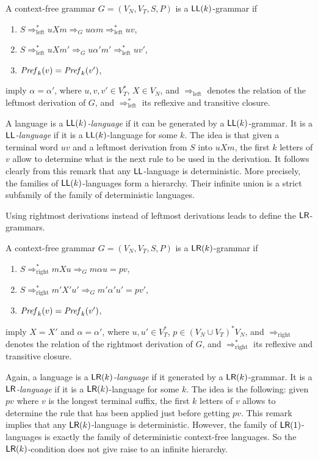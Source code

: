 A context-free grammar $G = (V_N, V_T, S, P)$ is a $\LL(k)$-grammar if

\begin{enumerate}[]
\item $S \Rightarrow^*_{\text{left}} u X m \Rightarrow_G u \alpha m \Rightarrow^*_{\text{left}} uv$,
\item $S \Rightarrow^*_{\text{left}} u X m' \Rightarrow_G u \alpha' m' \Rightarrow^*_{\text{left}} uv'$,
\item $\mbox{\it Pref\/}_k(v) = \mbox{\it Pref\/}_k(v')$,
\end{enumerate}

\noindent imply $\alpha = \alpha'$, where $u, v, v' \in V_T^*$, $X \in V_N$, and $\Rightarrow_{\text{left}}$ denotes the relation of the leftmost derivation of $G$, and $\Rightarrow^*_{\text{left}}$ its reflexive and transitive closure.

A language is a \emph{$\LL(k)$-language} if it can be generated by a $\LL(k)$-grammar. It is a \emph{$\LL$-language} if it is a $\LL(k)$-language for some $k$. The idea is that given a terminal word $uv$ and a leftmost derivation from $S$ into $uXm$, the first $k$ letters of $v$ allow to determine what is the next rule to be used in the derivation. It follows clearly from this remark that any $\LL$-language is deterministic. More precisely, the families of $\LL(k)$-languages form a hierarchy. Their infinite union is a strict subfamily of the family of deterministic languages.

Using rightmost derivations instead of leftmost derivations leads to define the $\LR$-grammars.

A context-free grammar $G = (V_N, V_T, S, P)$ is a $\LR(k)$-grammar if

\begin{enumerate}[]
\item $S \Rightarrow^*_{\text{right}} m X u \Rightarrow_G m \alpha u = pv$,
\item $S \Rightarrow^*_{\text{right}} m' X' u' \Rightarrow_G m' \alpha' u' = pv'$,
\item $\mbox{\it Pref\/}_k(v) = \mbox{\it Pref\/}_k(v')$,
\end{enumerate}

\noindent imply $X = X'$ and $\alpha = \alpha'$, where $u, u' \in V_T^*$, $p \in (V_N \cup V_T)^* V_N$, and $\Rightarrow_{\text{right}}$ denotes the relation of the rightmost derivation of $G$, and $\Rightarrow^*_{\text{right}}$ its reflexive and transitive closure.

Again, a language is a \emph{$\LR(k)$-language} if it generated by a $\LR(k)$-grammar. It is a \emph{$\LR$-language} if it is a $\LR(k)$-language for some $k$. The idea is the following: given $pv$ where $v$ is the longest terminal suffix, the first $k$ letters of $v$ allows to determine the rule that has been applied just before getting $pv$. This remark implies that any $\LR(k)$-language is deterministic. However, the family of $\LR(1)$-languages is exactly the family of deterministic context-free languages. So the $\LR(k)$-condition does not give raise to an infinite hierarchy.

